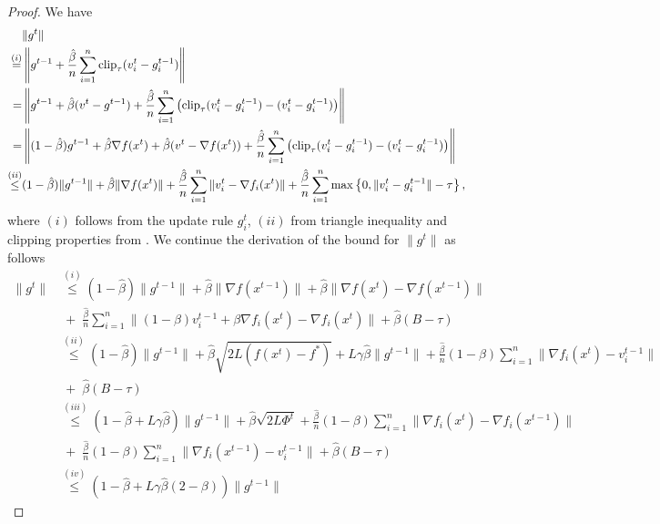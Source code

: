 \documentclass[a4paper,11pt]{article}
\begin{document}
\begin{proof}
    We have 
    \begin{align*}
        &\|g^t\|\\
        \overset{(i)}{=}& \left\|g^{t-1} + \frac{\hat{\beta}}{n}\sum_{i=1}^n \operatorname{clip}_\tau(v_i^t-g_i^{t-1})\right\|\\
        =& \left\|g^{t-1} + \hat{\beta}(v^t - g^{t-1})
        + \frac{\hat{\beta}}{n}\sum_{i=1}^n \left(\operatorname{clip}_\tau(v_i^t-g_i^{t-1}) - (v_i^{t} - g_i^{t-1})\right)\right\|\\
        =& \left\|(1-\hat{\beta})g^{t-1} 
        + \hat{\beta}\nabla f(x^t) + \hat{\beta}(v^t-\nabla f(x^t)) 
        + \frac{\hat{\beta}}{n}\sum_{i=1}^n \left( \operatorname{clip}_\tau(v_i^t-g_i^{t-1}) - (v_i^t-g_i^{t-1})\right)\right\|\\
        \overset{(ii)}{\le}& 
        (1-\hat{\beta})\|g^{t-1}\|
        + \hat{\beta}\|\nabla f(x^t)\| 
        + \frac{\hat{\beta}}{n}\sum_{i=1}^n \|v_i^t-\nabla f_i(x^t)\| + \frac{\hat{\beta}}{n}\sum_{i=1}^n\max\left\{0, \|v_i^t-g_i^{t-1}\| -\tau\right\},
    \end{align*}
    where $(i)$ follows from the update rule $g_i^t$, $(ii)$ from triangle inequality and clipping properties from . We continue the derivation of the bound for $\|g^t\|$ as follows
    \begin{align*}
        \|g^t\| 
        &\overset{(i)}{\le} (1-\hat{\beta})\|g^{t-1}\|
        + \hat{\beta}\|\nabla f(x^{t-1})\| 
        + \hat{\beta}\|\nabla f(x^t) - \nabla f(x^{t-1})\|\\ 
        & \;+\; \frac{\hat{\beta}}{n}\sum_{i=1}^n \|(1-\beta)v_i^{t-1}  + \beta\nabla f_i(x^t) -\nabla f_i(x^t)\|
        + \hat{\beta}(B-\tau)\\
        &\overset{(ii)}{\le} (1-\hat{\beta})\|g^{t-1}\|
        + \hat{\beta}\sqrt{2L(f(x^t) - f^*)}
        + L\gamma\hat{\beta}\|g^{t-1}\|
        + \frac{\hat{\beta}}{n}(1-\beta)\sum_{i=1}^n\|\nabla f_i(x^t) - v_i^{t-1}\|\\
        &\;+\; \hat{\beta}(B-\tau)\\
        &\overset{(iii)}{\le} (1-\hat{\beta} + L\gamma\hat{\beta})\|g^{t-1}\|
        + \hat{\beta}\sqrt{2L\Phi^t}
        + \frac{\hat{\beta}}{n}(1-\beta)\sum_{i=1}^n\|\nabla f_i(x^t) - \nabla f_i(x^{t-1})\|\\
        & \;+\; \frac{\hat{\beta}}{n}(1-\beta)\sum_{i=1}^n\|\nabla f_i(x^{t-1}) - v_i^{t-1}\|
        + \hat{\beta}(B-\tau)\\
        &\overset{(iv)}{\le} (1-\hat{\beta} + L\gamma\hat{\beta}(2-\beta)) \|g^{t-1}\|

\end{align*}
\end{proof}
\end{document}
